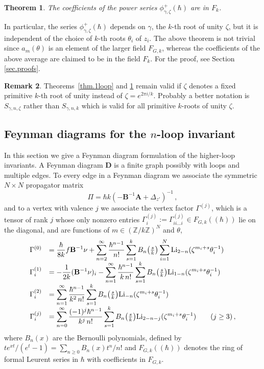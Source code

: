 \documentclass[12pt]{amsart}
\newtheorem{theorem}{Theorem}[section]
\theoremstyle{definition}
\newtheorem{remark}[theorem]{Remark}
\def\BZ{\mathbb Z}
\def\ga{\gamma}
\def\th{\theta}
\def\be{  \begin{equation} }
\def\ee{  \end{equation} }
\newcommand{\Li}{{\rm Li}}
\newcommand{\mb}{\mathbf}
\begin{document}
\begin{theorem}
\label{thm.1}
The coefficients of the power series $\phi^+_{\ga,\zeta}(\hbar)$ are in
$F_k$.
\end{theorem}
In particular, the series $\phi^+_{\ga,\zeta}(\hbar)$ depends on $\gamma$,
the $k$-th root of unity $\zeta$, but it is independent of the
choice of $k$-th roots $\th_i$ of $z_i$. 
The above theorem is not trivial since $a_m(\th)$ is an element of the
larger field $F_{G,k}$, whereas the coefficients of the above average are
claimed to be in the field $F_k$. 
For the proof, see Section \ref{sec.proofs}.

\begin{remark}
\label{rem.primitivek}
Theorems~\ref{thm.1loop} and \ref{thm.1} remain valid if $\zeta$ denotes 
a fixed primitive $k$-th root of unity instead of $\zeta=e^{2 \pi i/k}$.
Probably a better notation is $S_{\ga,n,\zeta}$ rather than $S_{\ga,n,k}$
which is valid for all primitive $k$-roots of unity $\zeta$.
\end{remark}

\subsection{Feynman diagrams for the $n$-loop invariant}
\label{sub.diagrams}

In this section we give a Feynman diagram formulation of the higher-loop
invariants.
A Feynman diagram $\mb D$ is a finite graph possibly with loops and multiple
edges. To every edge in a Feynman diagram we associate the symmetric 
$N\times N$ propagator matrix
%
\be  \Pi =  \hbar k (-\mb B^{-1}\mb A + \Delta_{z'})^{-1}\,, \ee
%
and to a vertex with valence $j$ we associate the vertex factor 
$\Gamma^{(j)}$, which is a tensor of rank $j$ whose only nonzero entries 
$\Gamma_i^{(j)} := \Gamma_{ii...i}^{(j)} \in F_{G,k}(\!(\hbar)\!)$ lie on the 
diagonal, and are functions of $m\in (\BZ/k\BZ)^N$ and $\theta$,
%
\be
\begin{array}{rl}
\Gamma^{(0)} &= \displaystyle \frac{\hbar}{8k}f\mb B^{-1}\nu 
+ \sum_{n=2}^\infty \frac{\hbar^{n-1}}{n!}\sum_{s=1}^k B_n
\big(\tfrac sk\big) \sum_{i=1}^N\Li_{2-n}(\zeta^{m_i+s} \theta_i^{-1}) \\[.1cm]
\Gamma_i^{(1)} &=  \displaystyle -\frac{1}{2k}(\mb B^{-1}\nu)_i 
- \sum_{n=1}^\infty \frac{\hbar^{n-1}}{k\,n!}\sum_{s=1}^k B_n
\big(\tfrac sk\big)\Li_{1-n}(\zeta^{m_i+s}\theta_i^{-1}) \\[.1cm]
\Gamma_i^{(2)} &= \displaystyle \sum_{n=1}^\infty 
\frac{\hbar^{n-1}}{k^2\,n!}\sum_{s=1}^k B_n\big(\tfrac sk\big)
\Li_{-n}(\zeta^{m_i+s}\theta_i^{-1}) \\[.1cm]
\Gamma_i^{(j)} &= \displaystyle \sum_{n=0}^\infty 
\frac{(-1)^j\hbar^{n-1}}{k^j\,n!}\sum_{s=1}^k B_n\big(\tfrac sk\big)
\Li_{2-n-j}(\zeta^{m_i+s}\theta_i^{-1})\qquad (j\geq 3)\,,
\end{array}
\ee
%
where $B_n(x)$ are the Bernoulli polynomials, defined by 
$te^{xt}/(e^t-1) = \sum_{n\geq 0}B_n(x)t^n/n!$ and $F_{G,k}(\!(\hbar)\!)$ denotes
the ring of formal Leurent series in $\hbar$ with coefficients in $F_{G,k}$.
\end{document}
